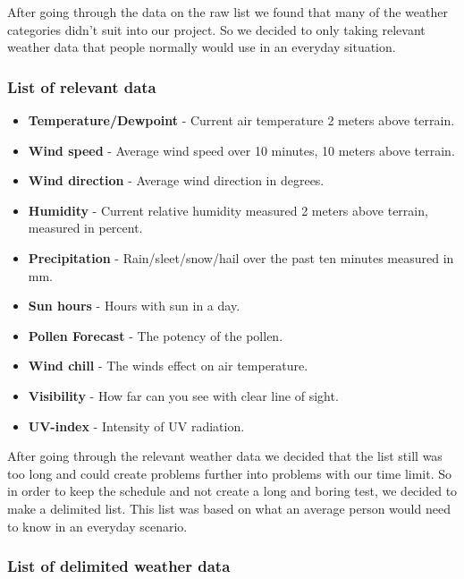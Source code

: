After going through the data on the raw list we found that many of the weather categories didn’t suit into our project. 
So we decided to only taking relevant weather data that people normally would use in an everyday situation.



\subsubsection*{List of relevant data} %
\label{ssub:list_of_relevant_data}

\begin{itemize}
     \item \textbf{Temperature/Dewpoint} - Current air temperature 2 meters above terrain.
     \item \textbf{Wind speed} - Average wind speed over 10 minutes, 10 meters above terrain.
     \item \textbf{Wind direction} - Average wind direction in degrees.
     \item \textbf{Humidity} - Current relative humidity measured 2 meters above terrain, measured in percent.
     \item \textbf{Precipitation} - Rain/sleet/snow/hail over the past ten minutes measured in mm.
     \item \textbf{Sun hours} - Hours with sun in a day.
     \item \textbf{Pollen Forecast} - The potency of the pollen.
     \item \textbf{Wind chill} - The winds effect on air temperature.
     \item \textbf{Visibility} - How far can you see with clear line of sight.
     \item \textbf{UV-index} - Intensity of UV radiation.
 \end{itemize}

After going through the relevant weather data we decided that the list still was too long and could create problems further into problems with our time limit. 
So in order to keep the schedule and not create a long and boring test, we decided to make a delimited list. 
This list was based on what an average person would need to know in an everyday scenario.



\subsubsection*{List of delimited weather data} %
\label{ssub:list_of_delimited_weather_data}

